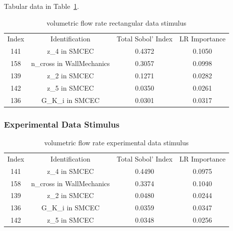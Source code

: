 \documentclass[12pt]{article}
\numberwithin{equation}{section}
\begin{document}
Tabular data in Table~\ref{qoi_vol_flow_rec}.

\begin{table}[h]
\centering
\begin{tabular}{cccc}
Index & Identification & Total Sobol' Index & LR Importance \\
141 &  z\_4 in SMCEC &  0.4372 & 0.1050\\
158 & n\_cross in WallMechanics & 0.3057 & 0.0998\\
 139 & z\_2 in SMCEC & 0.1271 & 0.0282\\
 142 & z\_5 in SMCEC & 0.0350 & 0.0261\\
  136 & G\_K\_i in SMCEC & 0.0301 & 0.0317\\
\end{tabular}
\caption{volumetric flow rate rectangular data stimulus}
\label{qoi_vol_flow_rec}
\end{table}

\newpage

\subsubsection{Experimental Data Stimulus}

\begin{table}[h]
\centering
\begin{tabular}{cccc}
Index & Identification & Total Sobol' Index & LR Importance \\
141 &  z\_4 in SMCEC & 0.4490 & 0.0975\\
158 & n\_cross in WallMechanics & 0.3374 & 0.1040\\
 139 & z\_2 in SMCEC & 0.0480 & 0.0244\\
   136 & G\_K\_i in SMCEC & 0.0359 & 0.0347\\
 142 & z\_5 in SMCEC & 0.0348 & 0.0256\\
\end{tabular}
\caption{volumetric flow rate experimental data stimulus}
\label{qoi_vol_flow_ex}
\end{table}
\end{document}
